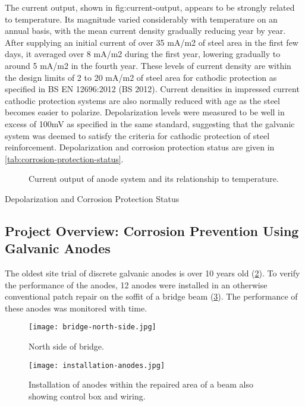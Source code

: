 The current output, shown in {fig:current-output}, appears to be strongly related to temperature. Its magnitude varied considerably with temperature on an annual basis, with the mean current density gradually reducing year by year. After supplying an initial current of over 35 mA/m2 of steel area in the first few days, it averaged over 8 mA/m2 during the first year, lowering gradually to around 5 mA/m2 in the fourth year. These levels of current density are within the design limits of 2 to 20 mA/m2 of steel area for cathodic protection as specified in BS EN 12696:2012 (BS 2012). Current densities in impressed current cathodic protection systems are also normally reduced with age as the steel becomes easier to polarize. Depolarization levels were measured to be well in excess of 100mV as specified in the same standard, suggesting that the galvanic system was deemed to satisfy the criteria for cathodic protection of steel reinforcement. Depolarization and corrosion protection status are given in \cref{tab:corrosion-protection-status}.

\begin{figure}
  \caption{Current output of anode system and its relationship to temperature.}\label{fig:current-output}
\end{figure}

\begin{table}
  \caption{Depolarization and Corrosion Protection Status}\label{tab:corrosion-protection-status}
\end{table}


\subsection{Project Overview: Corrosion Prevention Using Galvanic Anodes}
The oldest site trial of discrete galvanic anodes is over 10 years old (\cref{fig:bridge-north-side}). To verify the performance of the anodes, 12 anodes were installed in an otherwise conventional patch repair on the soffit of a bridge beam (\cref{fig:installation-anodes}). The performance of these anodes was monitored with time.

\begin{figure}
  \texttt{[image: bridge-north-side.jpg]}
  \caption{North side of bridge.}
  \label{fig:bridge-north-side}
\end{figure}
\begin{figure}
  \texttt{[image: installation-anodes.jpg]}
  \caption{Installation of anodes within the repaired area of a beam also showing control box and wiring.}
  \label{fig:installation-anodes}
\end{figure}

